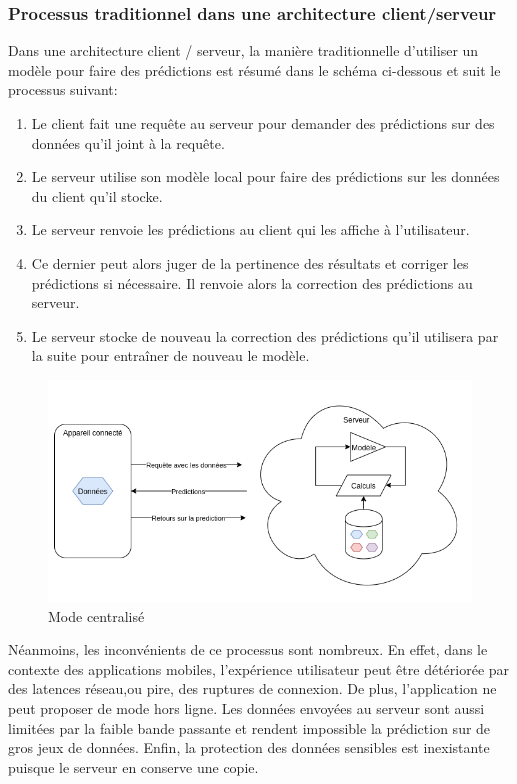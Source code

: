 \documentclass{article}
\begin{document}
\subsubsection{Processus traditionnel dans une architecture client/serveur}

Dans une architecture client / serveur, la manière traditionnelle d'utiliser un modèle pour faire des prédictions est résumé dans le schéma ci-dessous et suit le processus suivant:

\begin{enumerate}
    \item Le client fait une requête au serveur pour demander des prédictions sur des données qu'il joint à la requête.
    \item Le serveur utilise son modèle local pour faire des prédictions sur les données du client qu'il stocke.
    \item Le serveur renvoie les prédictions au client qui les affiche à l'utilisateur.
    \item Ce dernier peut alors juger de la pertinence des résultats et corriger les prédictions si nécessaire. Il renvoie alors la correction des prédictions au serveur.
    \item Le serveur stocke de nouveau la correction des prédictions qu'il utilisera par la suite pour entraîner de nouveau le modèle.
\end{enumerate}

    \begin{figure}[H]
    \includegraphics[width=\textwidth]{img/centralize.png}
    \caption{Mode centralisé}
    \end{figure}
    
Néanmoins, les inconvénients de ce processus sont nombreux. En effet, dans le contexte des applications mobiles, l'expérience utilisateur peut être détériorée par des latences réseau,ou pire, des ruptures de connexion. De plus, l'application ne peut proposer de mode hors ligne. Les données envoyées au serveur sont aussi limitées par la faible bande passante et rendent impossible la prédiction sur de gros jeux de données. Enfin, la protection des données sensibles est inexistante puisque le serveur en conserve une copie.
\end{document}
